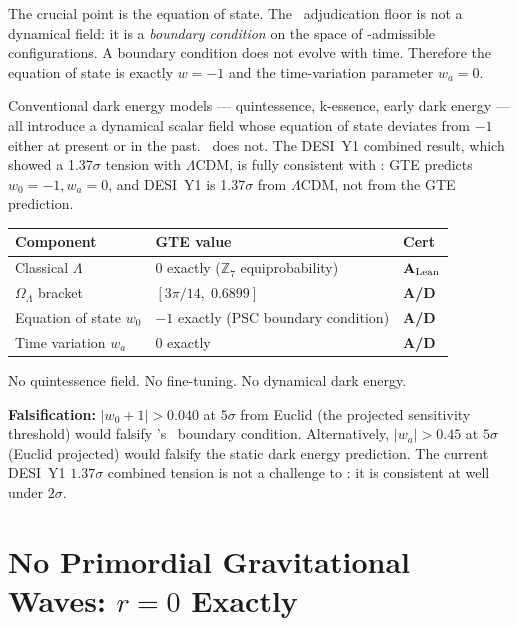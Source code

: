 \documentclass[11pt,openany]{book}
\theoremstyle{remark}
\newcommand{\GTE}{\text{GTE}}
\newcommand{\PSC}{\text{PSC}}
\newcommand{\ZS}{\mathbb{Z}_7}
\newcommand{\CatAL}{\ensuremath{\textbf{A}_{\rm Lean}}}
\newcommand{\CatAD}{\textbf{A/D}}
\begin{document}
The crucial point is the equation of state.  The \PSC\ adjudication floor is not a
dynamical field: it is a \emph{boundary condition} on the space of \PSC-admissible
configurations.  A boundary condition does not evolve with time.  Therefore the
equation of state is exactly $w = -1$ and the time-variation parameter $w_a = 0$.

Conventional dark energy models --- quintessence, k-essence, early dark energy --- all
introduce a dynamical scalar field whose equation of state deviates from $-1$ either
at present or in the past.  \GTE\ does not.  The DESI~Y1 combined result, which
showed a 1.37$\sigma$ tension with $\Lambda$CDM, is fully consistent with \GTE:
GTE predicts $w_0 = -1, w_a = 0$, and DESI~Y1 is 1.37$\sigma$ from $\Lambda$CDM,
not from the GTE prediction.

\begin{tcolorbox}[colback=orange!5,colframe=orange!60,
  title={Result: Three-Level CC Resolution (\CatAL + \CatAD)}]
\begin{tabular}{@{}lll@{}}
Component & GTE value & Cert \\
\hline
Classical $\Lambda$ & $0$ exactly ($\ZS$ equiprobability) & \CatAL \\
$\Omega_\Lambda$ bracket & $[3\pi/14,\;0.6899]$ & \CatAD \\
Equation of state $w_0$ & $-1$ exactly (PSC boundary condition) & \CatAD \\
Time variation $w_a$ & $0$ exactly & \CatAD \\
\end{tabular}
\medskip

No quintessence field.  No fine-tuning.  No dynamical dark energy.
\end{tcolorbox}

\textbf{Falsification:}  $|w_0 + 1| > 0.040$ at $5\sigma$ from Euclid (the projected
sensitivity threshold) would falsify \GTE's \PSC\ boundary condition.  Alternatively,
$|w_a| > 0.45$ at $5\sigma$ (Euclid projected) would falsify the static dark energy
prediction.  The current DESI~Y1 $1.37\sigma$ combined tension is not a challenge
to \GTE: it is consistent at well under $2\sigma$.

\section{No Primordial Gravitational Waves: \texorpdfstring{$r = 0$}{r = 0} Exactly}
\label{sec:r_zero}
\end{document}
